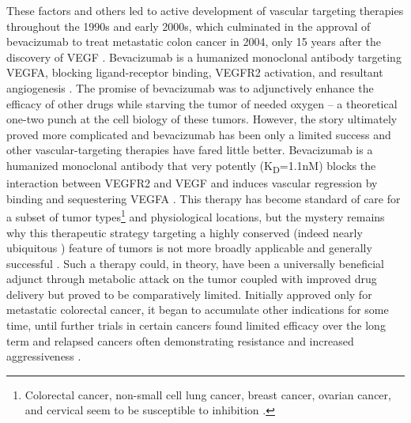 These factors and others led to active development of vascular targeting therapies throughout the 1990s and early 2000s, which culminated in the approval of bevacizumab to treat metastatic colon cancer in 2004, only 15 years after the discovery of VEGF \citep{Ferrara2004, Leung1989, Gordon2005b, McCormack2008, Kabbinavar2005, Muhsin2004}. Bevacizumab is a humanized monoclonal antibody targeting VEGFA, blocking ligand\hyp{}receptor binding, VEGFR2 activation, and resultant angiogenesis \citep{Keating2014}. The promise of bevacizumab was to adjunctively enhance the efficacy of other drugs while starving the tumor of needed oxygen -- a theoretical one\hyp{}two punch at the cell biology of these tumors. However, the story ultimately proved more complicated and bevacizumab has been only a limited success and other vascular\hyp{}targeting therapies have fared little better. Bevacizumab is a humanized monoclonal antibody that very potently (K\textsubscript{D}=1.1nM) blocks the interaction between VEGFR2 and VEGF and induces vascular regression by binding and sequestering VEGFA \citep{Papadopoulos2012, Yang2014a}. This therapy has become standard of care for a subset of tumor types\footnote{Colorectal cancer, non\hyp{}small cell lung cancer, breast cancer, ovarian cancer, and cervical seem to be susceptible to inhibition \citep{KazaziHyseni2010, Garcia2013, Baraniskin2019, Botrel2016, Gridelli2018, Tewari2014}.} and physiological locations, but the mystery remains why this therapeutic strategy targeting a highly conserved (indeed nearly ubiquitous \citep{Donnem2018}) feature of tumors is not more broadly applicable and generally successful \citep{VanMeter2010}. Such a therapy could, in theory, have been a universally beneficial adjunct through metabolic attack on the tumor coupled with improved drug delivery but proved to be comparatively limited. Initially approved only for metastatic colorectal cancer, it began to accumulate other indications for some time, until further trials in certain cancers found limited efficacy over the long term and relapsed cancers often demonstrating resistance and increased aggressiveness \citep{Itatani2018, Rivera2015}. 

